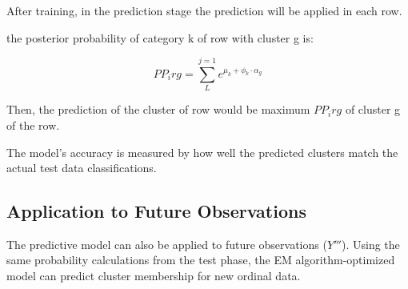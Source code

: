 \documentclass{article}
\begin{document}
After training, in the prediction stage the prediction will be applied in each row.

the posterior probability of category k of row with cluster g is:

\begin{equation}
PP_irg = \sum_{L}^{j=1} e^{\mu_k + \phi_k \cdot \alpha_g}
\end{equation}

Then, the prediction of the cluster of row would be maximum $PP_irg$ of cluster g of the row.

The model's accuracy is measured by how well the predicted clusters match the actual test data classifications.

\subsection*{Application to Future Observations}

The predictive model can also be applied to future observations ($Y'''$). Using the same probability calculations from the test phase, the EM algorithm-optimized model can predict cluster membership for new ordinal data.



\end{document}

